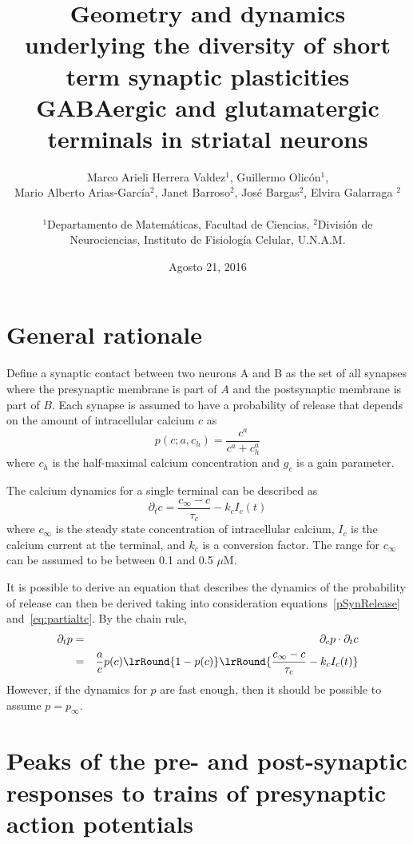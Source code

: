 \documentclass[10pt]{article}
\title{Geometry and dynamics underlying the diversity of short term synaptic plasticities  GABAergic and glutamatergic terminals in striatal neurons}
\author{
Marco Arieli Herrera Valdez$^1$, Guillermo Olicón$^1$,\\  
Mario Alberto Arias-García$^2$, Janet Barroso$^2$,  José Bargas$^2$, Elvira Galarraga $^2$\\
\begin{small}
{$^1$Departamento de Matemáticas, Facultad de Ciencias, 
$^2$División de Neurociencias, Instituto de Fisiología Celular, U.N.A.M.}
\end{small}
}
\date{Agosto 21, 2016}
\begin{document}
\maketitle

\section{General rationale}

Define a synaptic contact between two neurons A and B as the set of all synapses where the presynaptic membrane is part of $A$ and the postsynaptic membrane is part of $B$. Each synapse is assumed to have a probability of release that depends on the amount of intracellular calcium $c$ as 
\begin{equation}
p (c;a,c_h)= \frac{c^{a}}{c^{a}+c_h^{a}}
\label{pSynRelease}
\end{equation}
where $c_{h}$ is the half-maximal calcium concentration and $g_c$ is a gain parameter.  

The calcium dynamics for a single terminal can be described as 
\begin{equation}
\partial_t c = \frac{c_{\infty}-c}{\tau_c} - k_c I_c(t)
\label{eq:partialtc}
\end{equation}
where $c_{\infty}$ is the steady state concentration of intracellular calcium, $I_c$ is the calcium current at the terminal, and $k_c$ is a conversion factor. 
The range for $c_{\infty}$ can be assumed to be between 0.1 and 0.5 $\mu$M. 

It is possible to derive an equation that describes the dynamics of the probability of release can then be derived taking into consideration equations~\eqref{pSynRelease} and~\eqref{eq:partialtc}. By the chain rule, 
\begin{eqnarray*}
\partial_t p &=& \partial_c p \cdot \partial_t c 
\\
&=& \frac{a}{c} p(c) \lrRound{1-p(c)}  \lrRound{\frac{c_{\infty}-c}{\tau_c} - k_c I_c(t)}
\end{eqnarray*}
However, if the dynamics for $p$ are fast enough, then it should be possible to assume $p = p_{\infty}$.

\section{Peaks of the pre- and post-synaptic responses to trains of presynaptic action potentials}
\end{document}
